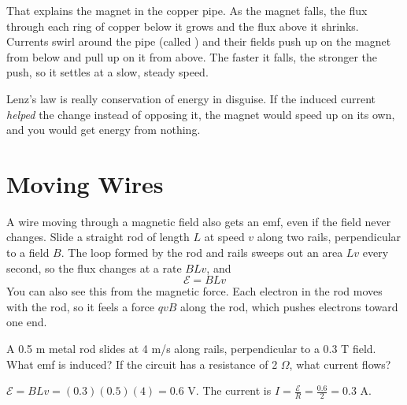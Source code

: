 That explains the magnet in the copper pipe. As the magnet falls, the flux
through each ring of copper below it grows and the flux above it shrinks.
Currents swirl around the pipe (called ) and their
fields push up on the magnet from below and pull up on it from above. The
faster it falls, the stronger the push, so it settles at a slow, steady
speed.

Lenz's law is really conservation of energy in disguise. If the induced
current \emph{helped} the change instead of opposing it, the magnet would
speed up on its own, and you would get energy from nothing.

\section{Moving Wires}
A wire moving through a magnetic field also gets an emf, even if the field
never changes. Slide a straight rod of length $L$ at speed $v$ along two
rails, perpendicular to a field $B$. The loop formed by the rod and rails
sweeps out an area $Lv$ every second, so the flux changes at a rate $BLv$,
and
$$\mathcal{E} = BLv$$
You can also see this from the magnetic force. Each electron in the rod
moves with the rod, so it feels a force $qvB$ along the rod, which pushes
electrons toward one end.

\begin{Exercise}[title={A sliding rod}, label=ind_rod]
A 0.5 m metal rod slides at 4 m/s along rails, perpendicular to a 0.3 T
field. What emf is induced? If the circuit has a resistance of 2 $\Omega$,
what current flows?
\end{Exercise}
\begin{Answer}[ref=ind_rod]
$\mathcal{E} = BLv = (0.3)(0.5)(4) = 0.6$ V. The current is
$I = \frac{\mathcal{E}}{R} = \frac{0.6}{2} = 0.3$ A.
\end{Answer}

